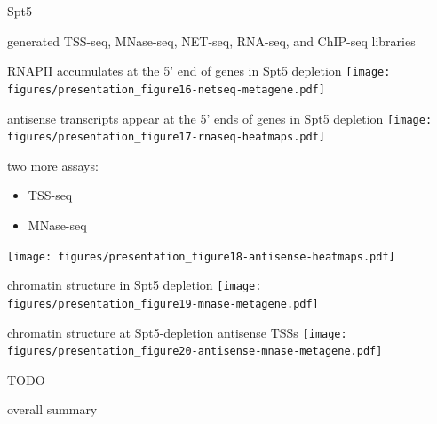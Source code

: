 \documentclass[aspectratio=169]{beamer}
\begin{document}
\begin{frame}{Spt5}
    \begin{description}[align=right, noitemsep]
        \item [Ameet Shetty] generated TSS-seq, MNase-seq, NET-seq, RNA-seq, and ChIP-seq libraries
    \end{description}
\end{frame}

\begin{frame}{RNAPII accumulates at the 5' end of genes in Spt5 depletion}
    \texttt{[image: figures/presentation\_figure16-netseq-metagene.pdf]}
\end{frame}

\begin{frame}{antisense transcripts appear at the 5' ends of genes in Spt5 depletion}
    \texttt{[image: figures/presentation\_figure17-rnaseq-heatmaps.pdf]}
\end{frame}

\begin{frame}
    two more assays:
    \begin{itemize}
        \item TSS-seq
        \item MNase-seq
    \end{itemize}
\end{frame}

\begin{frame}
    \texttt{[image: figures/presentation\_figure18-antisense-heatmaps.pdf]}
\end{frame}

\begin{frame}{chromatin structure in Spt5 depletion}
    \texttt{[image: figures/presentation\_figure19-mnase-metagene.pdf]}
\end{frame}

\begin{frame}{chromatin structure at Spt5-depletion antisense TSSs}
    \texttt{[image: figures/presentation\_figure20-antisense-mnase-metagene.pdf]}
\end{frame}

\begin{frame}
    TODO
\end{frame}

\begin{frame}
    overall summary
\end{frame}
\end{document}
